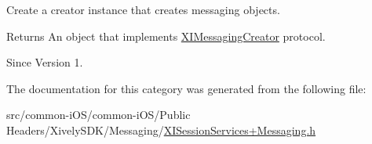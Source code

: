 Create a creator instance that creates messaging objects. 

\begin{DoxyReturn}{Returns}
An object that implements \hyperlink{}{X\+I\+Messaging\+Creator} protocol. 
\end{DoxyReturn}
\begin{DoxySince}{Since}
Version 1. 
\end{DoxySince}


The documentation for this category was generated from the following file\+:\begin{DoxyCompactItemize}
\item 
src/common-\/i\+O\+S/common-\/i\+O\+S/\+Public Headers/\+Xively\+S\+D\+K/\+Messaging/\hyperlink{_x_i_session_services_09_messaging_8h}{X\+I\+Session\+Services+\+Messaging.\+h}\end{DoxyCompactItemize}
